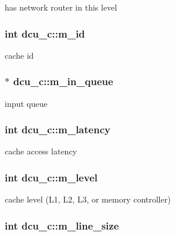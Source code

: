 \label{classdcu__c_afd4171d11831e26978f2ce21659b17f8}
has network router in this level \hypertarget{classdcu__c_a61b5178afb8d6af167a3ca3c40aca074}{
\subsubsection[{m\_\-id}]{\setlength{\rightskip}{0pt plus 5cm}int {\bf dcu\_\-c::m\_\-id}}}
\label{classdcu__c_a61b5178afb8d6af167a3ca3c40aca074}
cache id \hypertarget{classdcu__c_a505f2cf05c56380770c1ab1a7f4fb80b}{
\subsubsection[{m\_\-in\_\-queue}]{$\ast$ {\bf dcu\_\-c::m\_\-in\_\-queue}}}
\label{classdcu__c_a505f2cf05c56380770c1ab1a7f4fb80b}
input queue \hypertarget{classdcu__c_a50a7913d80d0128e9d8926f9104f8e19}{
\subsubsection[{m\_\-latency}]{\setlength{\rightskip}{0pt plus 5cm}int {\bf dcu\_\-c::m\_\-latency}}}
\label{classdcu__c_a50a7913d80d0128e9d8926f9104f8e19}
cache access latency \hypertarget{classdcu__c_a04d10c0ce98426f7b14d37c8c60150c0}{
\subsubsection[{m\_\-level}]{\setlength{\rightskip}{0pt plus 5cm}int {\bf dcu\_\-c::m\_\-level}}}
\label{classdcu__c_a04d10c0ce98426f7b14d37c8c60150c0}
cache level (L1, L2, L3, or memory controller) \hypertarget{classdcu__c_a54a23275701e0abe535da85c54252ac8}{
\subsubsection[{m\_\-line\_\-size}]{\setlength{\rightskip}{0pt plus 5cm}int {\bf dcu\_\-c::m\_\-line\_\-size}}}
